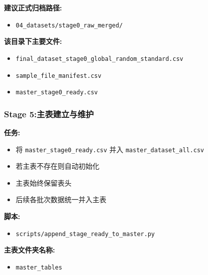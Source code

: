\documentclass[lang=cn,scheme=chinese,color=blue,device=normal,toc=onecol,math=cm]{elegantbook}
\begin{document}
\textbf{建议正式归档路径:}\par


\begin{itemize}
\item \texttt{04\_\allowbreak{}datasets/\allowbreak{}stage0\_\allowbreak{}raw\_\allowbreak{}merged/\allowbreak{}}
\end{itemize}


\textbf{该目录下主要文件:}\par


\begin{itemize}
\item \texttt{final\_\allowbreak{}dataset\_\allowbreak{}stage0\_\allowbreak{}global\_\allowbreak{}random\_\allowbreak{}standard.csv}
\item \texttt{sample\_\allowbreak{}file\_\allowbreak{}manifest.csv}
\item \texttt{master\_\allowbreak{}stage0\_\allowbreak{}ready.csv}
\end{itemize}


\subsubsection{Stage 5:主表建立与维护}


\textbf{任务:}\par


\begin{itemize}
\item 将 \texttt{master\_\allowbreak{}stage0\_\allowbreak{}ready.csv} 并入 \texttt{master\_\allowbreak{}dataset\_\allowbreak{}all.csv}
\item 若主表不存在则自动初始化
\item 主表始终保留表头
\item 后续各批次数据统一并入主表
\end{itemize}


\textbf{脚本:}\par


\begin{itemize}
\item \texttt{scripts/\allowbreak{}append\_\allowbreak{}stage\_\allowbreak{}ready\_\allowbreak{}to\_\allowbreak{}master.py}
\end{itemize}


\textbf{主表文件夹名称:}\par


\begin{itemize}
\item \texttt{master\_\allowbreak{}tables}
\end{itemize}
\end{document}

